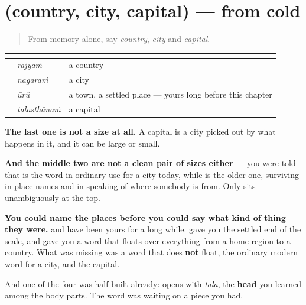 \section[(country, city, capital)]{(country, city, capital) — from cold}

\label{lesson:ML-R105-places-recall}



\begin{quote}
From memory alone, say \emph{country}, \emph{city} and \emph{capital}.
\end{quote}

\begin{grammarlens}[title={Grammar Lens: a scale, and one word that is not on it}]
\noindent
\begin{tabularx}{\linewidth}{@{}>{\raggedright\arraybackslash}X>{\raggedright\arraybackslash}X>{\raggedright\arraybackslash}X@{}}
\toprule
\textbf{} & \textbf{} & \textbf{} \\
\midrule
\textbf{\ml{രാജ്യം}} & \emph{rājyaṁ} & a country \\
\textbf{\ml{നഗരം}} & \emph{nagaraṁ} & a city \\
\textbf{\ml{ഊര്}} & \emph{ūrŭ} & a town, a settled place — yours long before this chapter \\
\textbf{\ml{തലസ്ഥാനം}} & \emph{talasthānaṁ} & a capital \\
\bottomrule
\end{tabularx}

\textbf{The last one is not a size at all.} A capital is a city picked out by what happens in it, and it can be large or small.

\textbf{And the middle two are not a clean pair of sizes either} — you were told that \textbf{} is the word in ordinary use for a city today, while \textbf{} is the older one, surviving in place-names and in speaking of where somebody is from. Only \textbf{} sits unambiguously at the top.
\end{grammarlens}

\begin{grammarlens}[title={What you've built}]
\textbf{You could name the places before you could say what kind of thing they were.} \textbf{} and \textbf{} have been yours for a long while. \textbf{} gave you the settled end of the scale, and \textbf{} gave you a word that floats over everything from a home region to a country. What was missing was a word that does \textbf{not} float, the ordinary modern word for a city, and the capital.

And one of the four was half-built already: \textbf{} opens with \emph{tala}, the \textbf{head} you learned among the body parts. The word was waiting on a piece you had.
\end{grammarlens}


